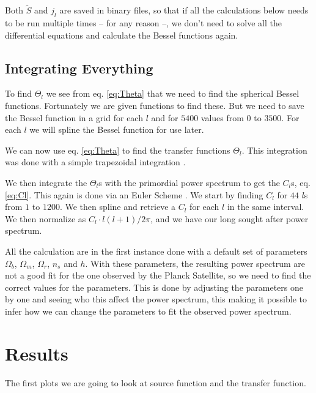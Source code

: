 \documentclass[a4paper,norsk, 10pt]{article}
\begin{document}
Both $\tilde{S}$ and $j_l$ are saved in binary files, so that if all the calculations below needs to be run multiple times -- for any reason --, we don't need to solve all the differential equations and calculate the Bessel functions again.

\subsection{Integrating Everything}
To find $\Theta_l$ we see from eq. \eqref{eq:Theta} that we need to find the spherical Bessel functions. Fortunately we are given functions to find these. But we need to save the Bessel function in a grid for each $l$ and for $5400$ values from $0$ to $3500$. For each $l$ we will spline the Bessel function for use later.

We can now use eq. \eqref{eq:Theta} to find the transfer functions $\Theta_l$. This integration was done with a simple trapezoidal integration . 

We then integrate the $\Theta_l$s with the primordial power spectrum to get the $C_l$s, eq. \eqref{eq:Cl}. This again is done via an Euler Scheme . We start by finding $C_l$ for $44$ $l$s from $1$ to $1200$. We then spline and retrieve a $C_l$ for each $l$ in the same interval. We then normalize as $C_l\cdot l(l+1)/2\pi$, and we have our long sought after power spectrum. 

All the calculation are in the first instance done with a default set of parameters $\Omega_b$, $\Omega_m$, $\Omega_r$, $n_s$ and $h$. With these parameters, the resulting power spectrum are not a good fit for the one observed by the Planck Satellite, so we need to find the correct values for the parameters. This is done by adjusting the parameters one by one and seeing who this affect the power spectrum, this making it possible to infer how we can change the parameters to fit the observed power spectrum.


\section{Results}

The first plots we are going to look at source function and the transfer function. 

\end{document}
